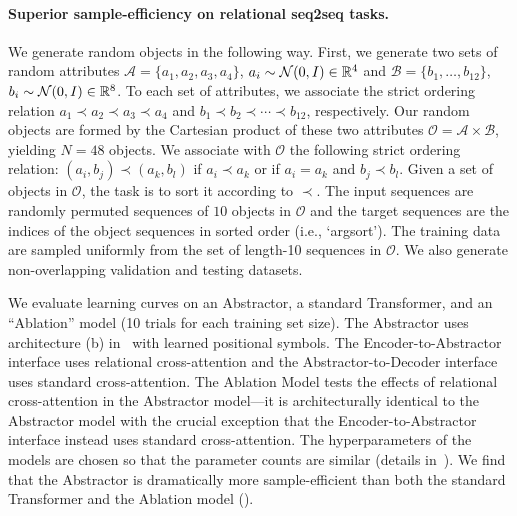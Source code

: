 \paragraph{Superior sample-efficiency on relational seq2seq tasks.}
We generate random objects in the following way. First, we generate two sets of random attributes $\mathcal{A} = \{a_1, a_2, a_3, a_4\}$, $a_i \sim {\mathcal{N}}(0, I) \in \mathbb{R}^{4}$ and $\mathcal{B} = \{b_1, \ldots, b_{12}\}$, $b_i \sim {\mathcal{N}}(0, I) \in \mathbb{R}^{8}$. To each set of attributes, we associate the strict ordering relation $a_1 \prec a_2 \prec a_3 \prec a_4$ and $b_1 \prec b_2 \prec \cdots \prec b_{12}$, respectively. Our random objects are formed by the Cartesian product of these two attributes $\mathcal{O} = \mathcal{A} \times \mathcal{B}$, yielding $N = 48$ objects.
We associate with $\mathcal{O}$ the following strict ordering relation: $(a_i, b_j) \prec (a_k, b_l)$ if $a_i \prec a_k$ or if $a_i = a_k$ and $b_j \prec b_l$. Given a set of objects in $\mathcal{O}$, the task is to sort it according to $\prec$. The input sequences are randomly permuted sequences of $10$ objects in $\mathcal{O}$ and the target sequences are the indices of the object sequences in sorted order (i.e., `argsort'). The training data are sampled uniformly from the set of length-10 sequences in $\mathcal{O}$. We also generate non-overlapping validation and testing datasets.

We evaluate learning curves on an Abstractor, a standard Transformer, and an ``Ablation'' model (10 trials for each training set size). The Abstractor uses architecture (b) in~ with learned positional symbols. The Encoder-to-Abstractor interface uses relational cross-attention and the Abstractor-to-Decoder interface uses standard cross-attention. The Ablation Model tests the effects of relational cross-attention in the Abstractor model---it is architecturally identical to the Abstractor model with the crucial exception that the Encoder-to-Abstractor interface instead uses standard cross-attention. The hyperparameters of the models are chosen so that the parameter counts are similar (details in~). We find that the Abstractor is dramatically more sample-efficient than both the standard Transformer and the Ablation model ().

